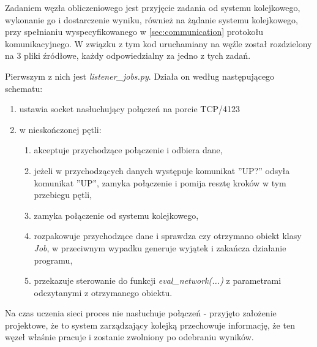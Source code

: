 Zadaniem węzła obliczeniowego jest przyjęcie zadania od systemu kolejkowego, wykonanie go i dostarczenie wyniku, również na żądanie systemu kolejkowego, przy spełnianiu wyspecyfikowanego w \ref{sec:communication} protokołu komunikacyjnego.
W związku z tym kod uruchamiany na węźle został rozdzielony na 3 pliki źródłowe, każdy odpowiedzialny za jedno z tych zadań.

Pierwszym z nich jest \textit{listener\_jobs.py}.
Działa on według następującego schematu:
\begin{enumerate}
  \item ustawia socket nasłuchujący połączeń na porcie TCP/4123
  \item w nieskończonej pętli:
  \begin{enumerate}
    \item akceptuje przychodzące połączenie i odbiera dane,
    \item jeżeli w przychodzących danych występuje komunikat ''UP?'' odsyła komunikat ''UP'', zamyka połączenie i pomija resztę kroków w tym przebiegu pętli,
    \item zamyka połączenie od systemu kolejkowego,
    \item rozpakowuje przychodzące dane i sprawdza czy otrzymano obiekt klasy \textit{Job}, w przeciwnym wypadku generuje wyjątek i zakańcza działanie programu,
    \item przekazuje sterowanie do funkcji \textit{eval\_network(...)} z parametrami odczytanymi z otrzymanego obiektu.
  \end{enumerate}
\end{enumerate}

Na czas uczenia sieci proces nie nasłuchuje połączeń - przyjęto założenie projektowe, że to system zarządzający kolejką przechowuje informację, że ten węzeł właśnie pracuje i zostanie zwolniony po odebraniu wyników.

